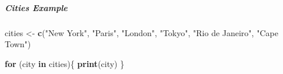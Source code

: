\documentclass[]{article}
\newenvironment{Shaded}{\begin{snugshade}}{\end{snugshade}}
\newcommand{\KeywordTok}[1]{\textcolor[rgb]{0.13,0.29,0.53}{\textbf{#1}}}
\newcommand{\StringTok}[1]{\textcolor[rgb]{0.31,0.60,0.02}{#1}}
\newcommand{\ControlFlowTok}[1]{\textcolor[rgb]{0.13,0.29,0.53}{\textbf{#1}}}
\newcommand{\NormalTok}[1]{#1}
\let\oldsubparagraph\subparagraph
\renewcommand{\subparagraph}[1]{\oldsubparagraph{#1}\mbox{}}
\begin{document}
\subparagraph{Cities Example}\label{cities-example}

\begin{Shaded}
\begin{Highlighting}[]
\NormalTok{cities  <-}\StringTok{ }\KeywordTok{c}\NormalTok{(}\StringTok{"New York"}\NormalTok{, }\StringTok{"Paris"}\NormalTok{, }\StringTok{"London"}\NormalTok{,}
             \StringTok{"Tokyo"}\NormalTok{, }\StringTok{"Rio de Janeiro"}\NormalTok{, }\StringTok{"Cape Town"}\NormalTok{)}

\ControlFlowTok{for}\NormalTok{ (city }\ControlFlowTok{in}\NormalTok{ cities)\{}
  \KeywordTok{print}\NormalTok{(city)}
\NormalTok{\}}
\end{Highlighting}
\end{Shaded}
\end{document}
